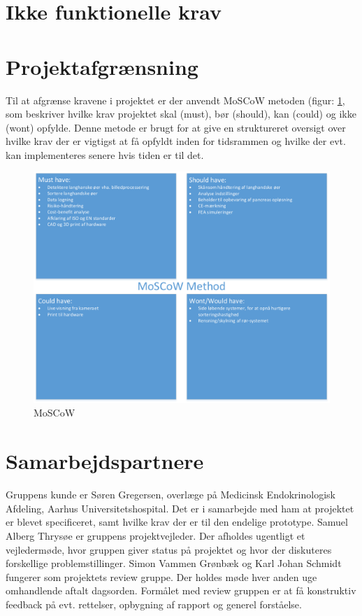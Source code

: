 \section{Ikke funktionelle krav}
 \label{subsec:qa}

\newpage

\newpage
\section{Projektafgrænsning}
Til at afgrænse kravene i projektet er der anvendt MoSCoW metoden (figur: \ref{fig:moscow}, som beskriver hvilke krav projektet skal (must), bør (should), kan (could) og ikke (wont) opfylde. Denne metode er brugt for at give en struktureret oversigt over hvilke krav der er vigtigst at få opfyldt inden for tidsrammen og hvilke der evt. kan implementeres senere hvis tiden er til det.

\begin{figure}[H]
	\centering
	\includegraphics[width=1\textwidth]{billeder/MoSCoW-crop.pdf}
	\caption{MoSCoW}
	\label{fig:moscow}
\end{figure}

\section{Samarbejdspartnere}
Gruppens kunde er Søren Gregersen, overlæge på Medicinsk Endokrinologisk Afdeling, Aarhus Universitetshospital. Det er i samarbejde med ham at projektet er blevet specificeret, samt hvilke krav der er til den endelige prototype.
Samuel Alberg Thrysøe er gruppens projektvejleder. Der afholdes ugentligt et vejledermøde, hvor gruppen giver status på projektet og hvor der diskuteres forskellige problemstillinger. 
Simon Vammen Grønbæk og Karl Johan Schmidt fungerer som projektets review gruppe. Der holdes møde hver anden uge omhandlende aftalt dagsorden. Formålet med review gruppen er at få konstruktiv feedback på evt. rettelser, opbygning af rapport og generel forståelse.
